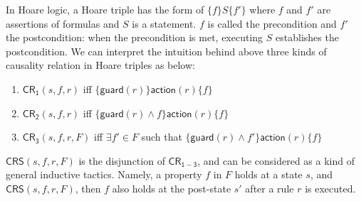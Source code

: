 \documentclass{llncs-new}
\newcommand \hoareTriple[3] {$\{#1\} #2  \{#3\}$}
\begin{document}
In Hoare logic, a Hoare triple has the form of \hoareTriple{f}{S}{f'}
where $f$ and $f'$ are assertions of formulas and $S$ is a statement.
$f$ is called the precondition and $f'$ the postcondition:
when the precondition is met, executing $S$ establishes the postcondition.
We can interpret the intuition behind above three kinds of causality relation in Hoare triples as below:

\begin{enumerate}
\item $\mathsf{CR_1} (s,f,r)$ iff  \hoareTriple{\mathsf{guard}(r)}{ \mathsf{action}(r)}{f}
\item $\mathsf{CR_2} (s,f,r)$ iff  \hoareTriple{\mathsf{guard}(r) \land f}{ \mathsf{action}(r)}{f}
\item $\mathsf{CR_3} (s,f,r,F)$ iff $\exists f'\in F$ such that \hoareTriple{\mathsf{guard}(r) \land f'}{\mathsf{action}(r)}{f}
\end{enumerate}

$\mathsf{CRS}(s, f, r, F)$ is the disjunction of $\mathsf{CR_{1-3}}$, and can be considered as a kind of general inductive tactics.
Namely, a property $f$ in $F$ holds at a state $s$, and  $\mathsf{CRS}(s, f, r, F)$,
then $f$ also holds at the post-state $s'$ after a rule $r$ is executed.
\end{document}
